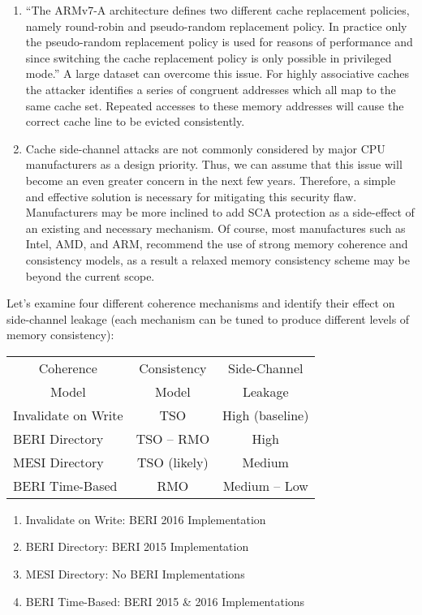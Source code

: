 \begin{enumerate}
	\item ``The ARMv7-A architecture defines two different cache replacement policies, namely round-robin and pseudo-random replacement policy. In practice only the pseudo-random replacement policy is used for reasons of performance and since switching the cache replacement policy is only possible in privileged mode.'' A large dataset can overcome this issue. For highly associative caches the attacker identifies a series of congruent addresses which all map to the same cache set. Repeated accesses to these memory addresses will cause the correct cache line to be evicted consistently.
	\item Cache side-channel attacks are not commonly considered by major CPU manufacturers as a design priority. Thus, we can assume that this issue will become an even greater concern in the next few years. Therefore, a simple and effective solution is necessary for mitigating this security flaw. Manufacturers may be more inclined to add SCA protection as a side-effect of an existing and necessary mechanism. Of course, most manufactures such as Intel, AMD, and ARM, recommend the use of strong memory coherence and consistency models, as a result a relaxed memory consistency scheme may be beyond the current scope.
	\end{enumerate}
	
	Let's examine four different coherence mechanisms and identify their effect on side-channel leakage (each mechanism can be tuned to produce different levels of memory consistency):
	
	\begin{table}[h]
	\begin{center}
	\begin{tabular}[c]{|l|c|c|}
		\hline
		\multicolumn{1}{|c|}{Coherence} & Consistency & Side-Channel \\
		\multicolumn{1}{|c|}{Model} & Model & Leakage \\
		\hline
		Invalidate on Write & TSO & High (baseline) \\
		BERI Directory & TSO -- RMO & High \\
		MESI Directory & TSO (likely) & Medium \\
		BERI Time-Based & RMO & Medium -- Low \\
		\hline
	\end{tabular}
	\end{center}
	\end{table}
	
	\begin{enumerate}
		\item Invalidate on Write: BERI 2016 Implementation 
		\item BERI Directory: BERI 2015 Implementation
		\item MESI Directory: No BERI Implementations 
		\item BERI Time-Based: BERI 2015 \& 2016 Implementations
	\end{enumerate}





